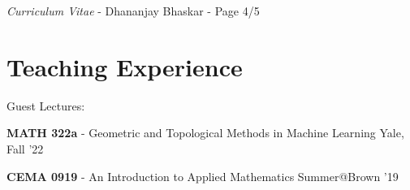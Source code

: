 \documentclass[margin,line]{res}
\newenvironment{list1}{
  \begin{list}{\ding{113}}{
      \setlength{\itemsep}{0in}
      \setlength{\parsep}{0in} \setlength{\parskip}{0in}
      \setlength{\topsep}{0in} \setlength{\partopsep}{0in}
      \setlength{\leftmargin}{0.17in}}}{\end{list}}
\begin{document}
\begin{resume}
{\begin{itemize}

\end{itemize}
}

\newpage
\begin{flushright}
\textit{Curriculum Vitae} - Dhananjay Bhaskar - Page 4/5
\end{flushright}
\vspace*{.02cm}


\section{\sc Teaching Experience}

Guest Lectures:
\vspace*{.2cm}

\begin{list1}
\setlength\itemsep{0.25em}
\item[] {\bf MATH 322a} - Geometric and Topological Methods in Machine Learning \hfill Yale, Fall '22
\item[] {\bf CEMA 0919} - An Introduction to Applied Mathematics \hfill Summer@Brown '19
\end{list1} 


\end{resume}
\end{document}
